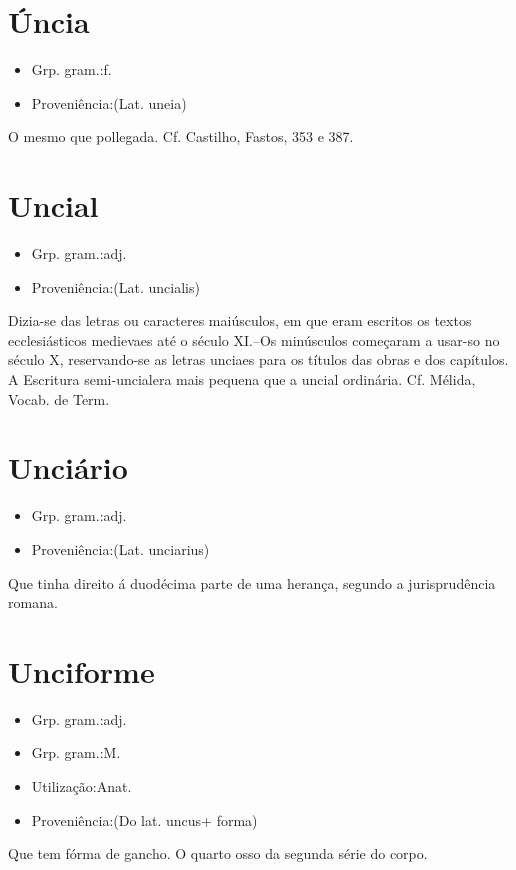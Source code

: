 \documentclass{article}
\begin{document}
\section{Úncia}
\begin{itemize}
\item {Grp. gram.:f.}
\end{itemize}
\begin{itemize}
\item {Proveniência:(Lat. \textunderscore uneia\textunderscore )}
\end{itemize}
O mesmo que \textunderscore pollegada\textunderscore . Cf. Castilho, \textunderscore Fastos\textunderscore , 353 e 387.
\section{Uncial}
\begin{itemize}
\item {Grp. gram.:adj.}
\end{itemize}
\begin{itemize}
\item {Proveniência:(Lat. \textunderscore uncialis\textunderscore )}
\end{itemize}
Dizia-se das letras ou caracteres maiúsculos, em que eram escritos os textos ecclesiásticos medievaes até o século XI.--Os minúsculos começaram a usar-so no século X, reservando-se as letras unciaes para os títulos das obras e dos capítulos. A Escritura \textunderscore semi-uncial\textunderscore  era mais pequena que a uncial ordinária. Cf. Mélida, \textunderscore Vocab. de Term.\textunderscore 
\section{Unciário}
\begin{itemize}
\item {Grp. gram.:adj.}
\end{itemize}
\begin{itemize}
\item {Proveniência:(Lat. \textunderscore unciarius\textunderscore )}
\end{itemize}
Que tinha direito á duodécima parte de uma herança, segundo a jurisprudência romana.
\section{Unciforme}
\begin{itemize}
\item {Grp. gram.:adj.}
\end{itemize}
\begin{itemize}
\item {Grp. gram.:M.}
\end{itemize}
\begin{itemize}
\item {Utilização:Anat.}
\end{itemize}
\begin{itemize}
\item {Proveniência:(Do lat. \textunderscore uncus\textunderscore  + \textunderscore forma\textunderscore )}
\end{itemize}
Que tem fórma de gancho.
O quarto osso da segunda série do corpo.
\end{document}
